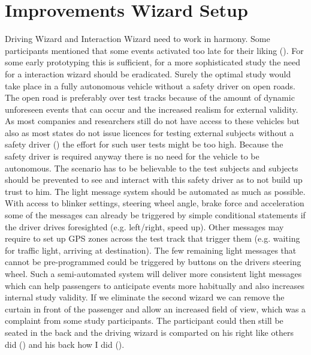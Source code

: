 \section{Improvements Wizard Setup}
\label{ImproveWizard}
Driving Wizard and Interaction Wizard need to work in harmony. Some participants mentioned that some events activated too late for their liking (). For some early prototyping this is sufficient, for a more sophisticated study the need for a interaction wizard should be eradicated. Surely the optimal study would take place in a fully autonomous vehicle without a safety driver on open roads. The open road is preferably over test tracks because of the amount of dynamic unforeseen events that can occur and the increased realism for external validity. As most companies and researchers still do not have access to these vehicles but also as most states do not issue licences for testing external subjects without a safety driver () the effort for such user tests might be too high. Because the safety driver is required anyway there is no need for the vehicle to be autonomous. The scenario has to be believable to the test subjects and subjects should be prevented to see and interact with this safety driver as to not build up trust to him. The light message system should be automated as much as possible. With access to blinker settings, steering wheel angle, brake force and acceleration some of the messages can already be triggered by simple conditional statements if the driver drives foresighted (e.g. left/right, speed up). Other messages may require to set up GPS zones across the test track that trigger them (e.g. waiting for traffic light, arriving at destination). The few remaining light messages that cannot be pre-programmed could be triggered by buttons on the drivers steering wheel. Such a semi-automated system will deliver more consistent light messages which can help passengers to anticipate events more habitually and also increases internal study validity. If we eliminate the second wizard we can remove the curtain in front of the passenger and allow an increased field of view, which was a complaint from some study participants. The participant could then still be seated in the back and the driving wizard is comparted on his right like others did () and his back how I did ().  

